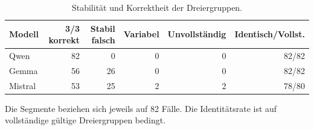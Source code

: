 \begin{table}[htbp]
\centering\small
\caption{Stabilität und Korrektheit der Dreiergruppen.}
\label{tab_v2_rq3}
\begin{tabular}{lrrrrr}
\toprule
Modell & 3/3 korrekt & Stabil falsch & Variabel & Unvollständig & Identisch/Vollst. \\
\midrule
Qwen & 82 & 0 & 0 & 0 & 82/82 \\
Gemma & 56 & 26 & 0 & 0 & 82/82 \\
Mistral & 53 & 25 & 2 & 2 & 78/80 \\
\bottomrule
\end{tabular}
\par\smallskip\noindent
\begin{minipage}{\linewidth}\footnotesize Die Segmente beziehen sich jeweils auf 82 Fälle. Die Identitätsrate ist auf vollständige gültige Dreiergruppen bedingt.\end{minipage}
\end{table}
